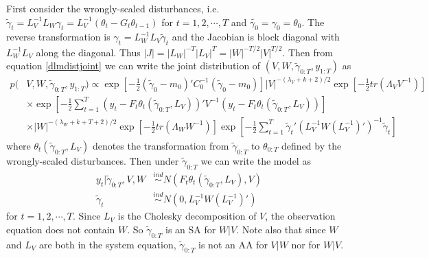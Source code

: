 \documentclass{article}
\begin{document}
First consider the wrongly-scaled disturbances, i.e. $\tilde{\gamma}_t = L_V^{-1}L_W\gamma_t= L_V^{-1}(\theta_t-G_t\theta_{t-1})$ for $t=1,2,\cdots,T$ and $\tilde{\gamma_0}=\gamma_0=\theta_0$. The reverse transformation is $\gamma_t = L_W^{-1}L_V\tilde{\gamma}_t$ and the Jacobian is block diagonal with $L_W^{-1}L_V$ along the diagonal. Thus $|J|=|L_W|^{-T}|L_V|^T=|W|^{-T/2}|V|^{T/2}$. Then from equation \eqref{dlmdistjoint} we can write the joint distribution of $(V,W,\tilde{\gamma}_{0:T},y_{1:T})$ as
 \begin{align}
  p(&V,W,\tilde{\gamma}_{0:T},y_{1:T}) \propto \exp\left[-\frac{1}{2}(\tilde{\gamma}_0-m_0)'C_0^{-1}(\tilde{\gamma}_0-m_0)\right] |V|^{-(\lambda_V + k + 2)/2}\exp\left[-\frac{1}{2}tr\left(\Lambda_VV^{-1}\right)\right]  \nonumber\\
  &\times  \exp\left[-\frac{1}{2}\sum_{t=1}^T\left(y_t - F_t\theta_t(\tilde{\gamma}_{0:T},L_V)\right)'V^{-1}\left(y_t - F_t\theta_t(\tilde{\gamma}_{0:T},L_V)\right)\right]\nonumber\\
   & \times |W|^{-(\lambda_W + k + T + 2)/2}\exp\left[-\frac{1}{2}tr\left(\Lambda_WW^{-1}\right)\right] \exp\left[-\frac{1}{2}\sum_{t=1}^T\tilde{\gamma}_t'(L_V^{-1}W(L_V^{-1})')^{-1}\tilde{\gamma}_t\right]\label{dlmdisttildejoint}
 \end{align}
where $\theta_t(\tilde{\gamma}_{0:T},L_V)$ denotes the transformation from $\tilde{\gamma}_{0:T}$ to $\theta_{0:T}$ defined by the wrongly-scaled disturbances. Then under $\tilde{\gamma}_{0:T}$ we can write the model as
\begin{align*}
  y_t|\tilde{\gamma}_{0:T},V,W & \stackrel{ind}{\sim} N\left(F_t\theta_t(\tilde{\gamma}_{0:T},L_V), V\right)\\
  \tilde{\gamma}_t & \stackrel{ind}{\sim}N(0,L_V^{-1}W(L_V^{-1})')
\end{align*}
for $t=1,2,\cdots,T$. Since $L_V$ is the Cholesky decomposition of $V$, the observation equation does not contain $W$. So $\tilde{\gamma}_{0:T}$ is an SA for $W|V$. Note also that since $W$ and $L_V$ are both in the system equation, $\tilde{\gamma}_{0:T}$ is not an AA for $V|W$ nor for $W|V$. 
\end{document}
